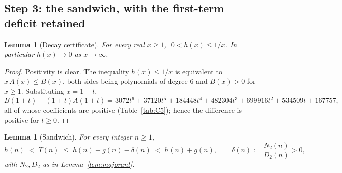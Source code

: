 \documentclass[11pt]{article}
\theoremstyle{plain}
\newtheorem{lemma}[theorem]{Lemma}
\theoremstyle{definition}
\theoremstyle{remark}
\numberwithin{equation}{section}
\begin{document}
\subsection{Step 3: the sandwich, with the first-term deficit retained}

\begin{lemma}[Decay certificate]
\label{lem:decay}
For every real $x \ge 1$, $\;0 < h(x) \le 1/x$. In particular $h(x) \to 0$ as $x \to \infty$.
\end{lemma}

\begin{proof}
Positivity is clear. The inequality $h(x) \le 1/x$ is equivalent to $x\,A(x) \le B(x)$, both
sides being polynomials of degree $6$ and $B(x) > 0$ for $x \ge 1$. Substituting $x = 1+t$,
\[
  B(1+t) - (1+t)A(1+t) = 3072t^6 + 37120t^5 + 184448t^4 + 482304t^3 + 699916t^2 + 534509t + 167757,
\]
all of whose coefficients are positive (Table~\ref{tab:C5}); hence the difference is positive
for $t \ge 0$.
\end{proof}

\begin{lemma}[Sandwich]
\label{lem:sandwich}
For every integer $n \ge 1$,
\[
  h(n) \;<\; T(n) \;\le\; h(n) + g(n) - \delta(n) \;<\; h(n) + g(n),
  \qquad \delta(n) := \frac{N_2(n)}{D_2(n)} > 0,
\]
with $N_2, D_2$ as in Lemma~\ref{lem:majorant}.
\end{lemma}
\end{document}
